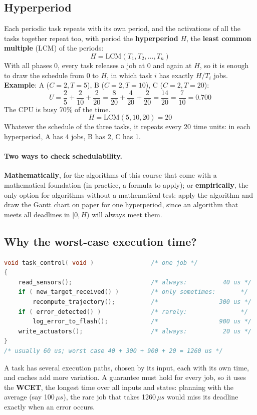 \subsection{Hyperperiod}
Each periodic task repeats with its own period, and the activations of all the tasks together repeat too, with period the \textbf{hyperperiod} $H$, the \textbf{least common multiple} (LCM) of the periods:
\[
H = \mathrm{LCM}(T_1, T_2, \dots, T_n)
\]
With all phases 0, every task releases a job at 0 and again at $H$, so it is enough to draw the schedule from 0 to $H$, in which task $i$ has exactly $H / T_i$ jobs. \textbf{Example}: A ($C = 2, T = 5$), B ($C = 2, T = 10$), C ($C = 2, T = 20$):
\[
U = \frac{2}{5} + \frac{2}{10} + \frac{2}{20} = \frac{8}{20} + \frac{4}{20} + \frac{2}{20} = \frac{14}{20} = \frac{7}{10} = 0.700
\]
The CPU is busy 70\% of the time.
\[
H = \mathrm{LCM}(5, 10, 20) = 20
\]
Whatever the schedule of the three tasks, it repeats every 20 time units: in each hyperperiod, A has 4 jobs, B has 2, C has 1.

\paragraph{Two ways to check schedulability.} \textbf{Mathematically}, for the algorithms of this course that come with a mathematical foundation (in practice, a formula to apply); or \textbf{empirically}, the only option for algorithms without a mathematical test: apply the algorithm and draw the Gantt chart on paper for one hyperperiod, since an algorithm that meets all deadlines in $[0, H)$ will always meet them.

\subsection{Why the worst-case execution time?}
\begin{lstlisting}[language=C]
void task_control( void )                /* one job */
{
    read_sensors();                      /* always:          40 us */
    if ( new_target_received() )         /* only sometimes:       */
        recompute_trajectory();          /*                 300 us */
    if ( error_detected() )              /* rarely:               */
        log_error_to_flash();            /*                 900 us */
    write_actuators();                   /* always:          20 us */
}
/* usually 60 us; worst case 40 + 300 + 900 + 20 = 1260 us */
\end{lstlisting}
A task has several execution paths, chosen by its input, each with its own time, and caches add more variation. A guarantee must hold for every job, so it uses the \textbf{WCET}, the longest time over all inputs and states: planning with the average (say 100\,$\mu s$), the rare job that takes 1260\,$\mu s$ would miss its deadline exactly when an error occurs.

